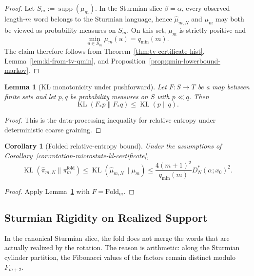 \documentclass[11pt,letterpaper]{article}
\numberwithin{equation}{section}
\theoremstyle{plain}
\newtheorem{lemma}[theorem]{Lemma}
\newtheorem{corollary}[theorem]{Corollary}
\theoremstyle{definition}
\theoremstyle{remark}
\newcommand{\Fold}{\mathrm{Fold}}
\DeclareMathOperator{\KL}{KL}
\DeclareMathOperator{\supp}{supp}
\begin{document}
\begin{proof}
Let \(S_m:=\supp(\mu_m)\). In the Sturmian slice \(\beta=\alpha\), every
observed length-\(m\) word belongs to the Sturmian language, hence
\(\hat\mu_{m,N}\) and \(\mu_m\) may both be viewed as probability measures on
\(S_m\). On this set, \(\mu_m\) is strictly positive and
\[
\min_{u\in S_m}\mu_m(u)=q_{\min}(m).
\]
The claim therefore follows from Theorem~\ref{thm:tv-certificate-hist},
Lemma~\ref{lem:kl-from-tv-qmin}, and
Proposition~\ref{prop:qmin-lowerbound-markov}.
\end{proof}

\begin{lemma}[KL monotonicity under pushforward]\label{lem:kl-monotone-pushforward}
Let $F:S\to T$ be a map between finite sets and let $p,q$ be probability
measures on $S$ with $p\ll q$.  Then
\[
\KL(F_*p\|F_*q)\le \KL(p\|q).
\]
\end{lemma}

\begin{proof}
This is the data-processing inequality for relative entropy under deterministic
coarse graining.
\end{proof}

\begin{corollary}[Folded relative-entropy bound]\label{cor:rotation-folded-kl-certificate}
Under the assumptions of
Corollary~\ref{cor:rotation-microstate-kl-certificate},
\[
\KL(\hat\pi_{m,N}\|\pi_m^{\mathrm{fold}})
\le
\KL(\hat\mu_{m,N}\|\mu_m)
\le
\frac{4(m+1)^2}{q_{\min}(m)}D_N^*(\alpha;x_0)^2.
\]
\end{corollary}

\begin{proof}
Apply Lemma~\ref{lem:kl-monotone-pushforward} with $F=\Fold_m$.
\end{proof}

\subsection{Sturmian Rigidity on Realized Support}

In the canonical Sturmian slice, the fold does not merge the words that are
actually realized by the rotation. The reason is arithmetic: along the
Sturmian cylinder partition, the Fibonacci values of the factors remain
distinct modulo \(F_{m+2}\).
\end{document}
